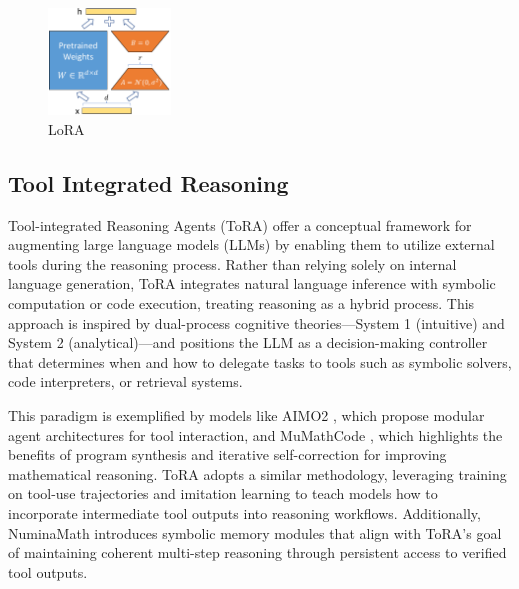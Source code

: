 \begin{figure}[hbtp]
  \centering
  \includegraphics[width=0.29\textwidth]{images/lora.pdf}
  \caption{LoRA}
  \label{fig:reparam}
\end{figure}

\subsection{Tool Integrated Reasoning}

Tool-integrated Reasoning Agents (ToRA) \cite{Gou2024ToRA} offer a conceptual framework for augmenting large language models (LLMs) by enabling them to utilize external tools during the reasoning process. Rather than relying solely on internal language generation, ToRA integrates natural language inference with symbolic computation or code execution, treating reasoning as a hybrid process. This approach is inspired by dual-process cognitive theories—System 1 (intuitive) and System 2 (analytical)—and positions the LLM as a decision-making controller that determines when and how to delegate tasks to tools such as symbolic solvers, code interpreters, or retrieval systems.

This paradigm is exemplified by models like AIMO2 \cite{Moshkov2025AIMO2}, which propose modular agent architectures for tool interaction, and MuMathCode \cite{Yin2024MuMathCode}, which highlights the benefits of program synthesis and iterative self-correction for improving mathematical reasoning. ToRA adopts a similar methodology, leveraging training on tool-use trajectories and imitation learning to teach models how to incorporate intermediate tool outputs into reasoning workflows. Additionally, NuminaMath \cite{Li2024NuminaMath, Fleureau2024NuminaMath} introduces symbolic memory modules that align with ToRA’s goal of maintaining coherent multi-step reasoning through persistent access to verified tool outputs.





